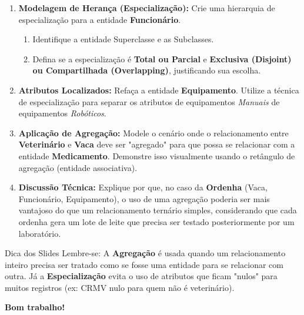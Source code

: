 \documentclass[12pt]{article}
\begin{document}
\begin{enumerate}[label=\textbf{\arabic*.}]
    
    \item \textbf{Modelagem de Herança (Especialização):}
    Crie uma hierarquia de especialização para a entidade \textbf{Funcionário}. 
    \begin{enumerate}[label=\alph*)]
        \item Identifique a entidade Superclasse e as Subclasses.
        \item Defina se a especialização é \textbf{Total ou Parcial} e \textbf{Exclusiva (Disjoint) ou Compartilhada (Overlapping)}, justificando sua escolha.
    \end{enumerate}

    \item \textbf{Atributos Localizados:}
    Refaça a entidade \textbf{Equipamento}. Utilize a técnica de especialização para separar os atributos de equipamentos \textit{Manuais} de equipamentos \textit{Robóticos}.

    \item \textbf{Aplicação de Agregação:}
    Modele o cenário onde o relacionamento entre \textbf{Veterinário} e \textbf{Vaca} deve ser "agregado" para que possa se relacionar com a entidade \textbf{Medicamento}. Demonstre isso visualmente usando o retângulo de agregação (entidade associativa).

    \item \textbf{Discussão Técnica:}
    Explique por que, no caso da \textbf{Ordenha} (Vaca, Funcionário, Equipamento), o uso de uma agregação poderia ser mais vantajoso do que um relacionamento ternário simples, considerando que cada ordenha gera um lote de leite que precisa ser testado posteriormente por um laboratório.

\end{enumerate}

\begin{block}{Dica dos Slides}
Lembre-se: A \textbf{Agregação} é usada quando um relacionamento inteiro precisa ser tratado como se fosse uma entidade para se relacionar com outra. Já a \textbf{Especialização} evita o uso de atributos que ficam "nulos" para muitos registros (ex: CRMV nulo para quem não é veterinário).
\end{block}

\vspace{0.5cm}
\begin{center}
    \textbf{Bom trabalho!}
\end{center}
\end{document}
